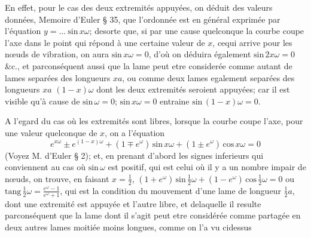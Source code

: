 \documentclass[11pt,a4paper]{article}
\begin{document}
En effet, pour le cas des deux extremités appuyées, on déduit des valeurs
données, Memoire d'Euler § 35, que l'ordonnée est en général exprimée par
l'équation $y = \dots\ \text{sin}\,x\omega$; desorte que, si par une cause quelconque la courbe
coupe l'axe dans le point qui répond à une certaine valeur de $x$, cequi
arrive pour les nœuds de vibration, on aura $\text{sin}\,x\omega = 0$, d'où on
déduira également $\text{sin}\,2x\omega = 0$ \&c., et parconséquent aussi que la lame
peut etre considerée comme autant de lames separées des longueurs
$xa$, ou comme deux lames egalement separées des longueurs $xa$ $(1-x)\omega$
dont les deux extremités seroient appuyées; car il est visible qu'à cause
de $\text{sin}\,\omega = 0$; $\text{sin}\,x\omega = 0$ entraine $\text{sin}\,(1-x)\omega = 0$.

A l'egard du cas où les extremités sont libres, lorsque la courbe
coupe l'axe, pour une valeur quelconque de $x$, on a l'équation
\[ e^{x\omega} \pm e^{(1-x)\omega} + (1 \mp e^{\omega})\,\text{sin}\,x\omega + (1 \pm e^{\omega})\,\text{cos}\,x\omega = 0 \]
(Voyez M. d'Euler § 2);
et, en prenant d'abord les signes inferieurs qui conviennent au cas où
$\text{sin}\,\omega$ est positif, qui est celui où il y a un nombre impair de nœuds,
on trouve, en faisant $x = \frac{1}{2}$, $(1 + e^{\omega})\,\text{sin}\,\frac{1}{2}\omega + (1 - e^{\omega})\,\text{cos}\,\frac{1}{2}\omega = 0$ ou
$\text{tang}\,\frac{1}{2}\omega = \frac{e^{\omega} - 1}{e^{\omega} + 1}$, qui est la condition du mouvement d'une lame de
longueur $\frac{1}{2}a$, dont une extremité est appuyée et l'autre libre, et delaquelle
il resulte parconséquent que la lame dont il s'agit peut etre
considérée comme partagée en deux autres lames moitiée moins
longues, comme on l'a vu cidessus

\end{document}
